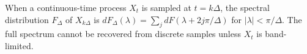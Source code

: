 When a continuous-time process $X_t$ is sampled at $t = k\Delta$, the spectral distribution $F_\Delta$ of $X_{k\Delta}$ is $dF_\Delta(\lambda) = \sum_{j} dF(\lambda + 2j\pi/\Delta)$ for $|\lambda| < \pi/\Delta$. The full spectrum cannot be recovered from discrete samples unless $X_t$ is band-limited.
